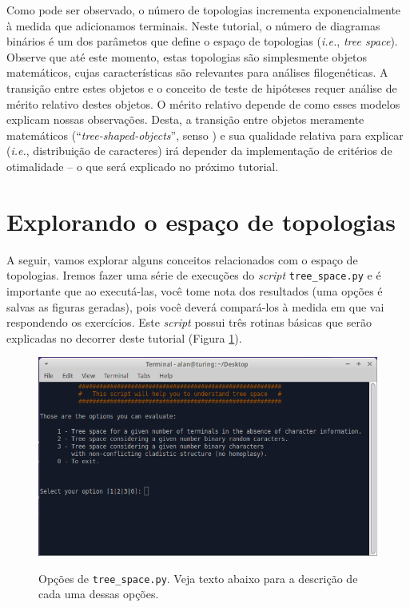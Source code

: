 \begin{refsection}


	Como pode ser observado, o número de topologias incrementa exponencialmente à medida que adicionamos terminais. Neste tutorial, o número de diagramas binários é um dos parâmetos que define o espaço de topologias (\textit{i.e.}, \textit{tree space}). Observe que até este momento, estas topologias são simplesmente objetos matemáticos, cujas características são relevantes para análises filogenéticas. A transição entre estes objetos e o conceito de teste de hipóteses requer análise de mérito relativo destes objetos. O mérito relativo depende de como esses modelos explicam nossas observações. Desta, a transição entre objetos meramente matemáticos (``\textit{tree-shaped-objects}'', senso \cite{Wheeler_2012}) e sua qualidade relativa para explicar (\textit{i.e.}, distribuição de caracteres) irá depender da implementação de critérios de otimalidade -- o que será explicado no próximo tutorial.


\section{Explorando o espaço de topologias}\label{tut3:tree_space_expĺore}

	A seguir, vamos explorar alguns conceitos relacionados com o espaço de topologias. Iremos fazer uma série de execuções do \textit{script} \texttt{tree\_space.py} e é importante que ao executá-las, você tome nota dos resultados (uma opções é salvas as figuras geradas), pois você deverá compará-los à medida em que vai respondendo os exercícios. Este \textit{script} possui três rotinas básicas que serão explicadas no decorrer deste tutorial (Figura \ref{tut3:fig:prompt}).

  \begin{figure}[H]
  \centering
      {\includegraphics[scale=0.60]{figures/tut3/tree_space_prompt.png}}
      {\caption[Opções de \texttt{tree\_space.py}]{Opções de \texttt{tree\_space.py}. Veja texto abaixo para a descrição de cada uma dessas opções.}\label{tut3:fig:prompt}}
  \end{figure}



\end{refsection}
